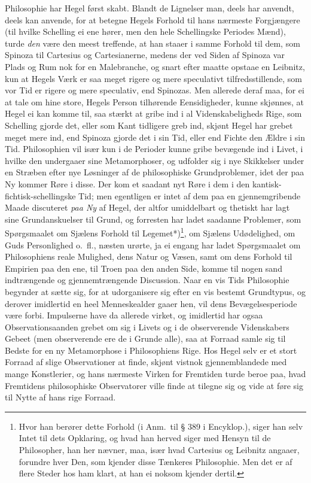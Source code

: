 \documentclass[12pt,a4paper]{book}
\newcommand{\apage}[1]{\marginnote{\footnotesize\textit{[#1]}}}
\begin{document}
Philosophie har Hegel først skabt. Blandt de Lignelser man, deels har
anvendt, deels kan anvende, for at betegne Hegels Forhold til hans nærmeste
Forgjængere (til hvilke Schelling ei ene hører, men den hele Schellingske
Periodes Mænd), turde \emph{den} være den meest treffende, at han staaer i samme
Forhold til dem, som Spinoza til Cartesius og Cartesianerne, medens der ved
Siden af Spinoza var Plads og Rum nok for en Malebranche, og snart efter
maatte opstaae en Leibnitz, kun at Hegels Værk er saa meget rigere og mere
speculativt tilfredsstillende, som vor Tid er rigere og mere speculativ, end
Spinozas. Men allerede deraf maa, for ei at tale om hine store, Hegels
Person tilhørende Eensidigheder, kunne skjønnes, at Hegel ei kan komme til,
saa stærkt at gribe ind i al Videnskabeligheds Rige, som Schelling gjorde
det, eller som Kant tidligere greb ind, skjønt Hegel har grebet meget mere
ind, end Spinoza gjorde det i sin Tid, eller end Fichte den Ældre i sin Tid.
Philosophien vil især kun i de Perioder kunne gribe bevægende ind i Livet, i
hvilke den undergaaer sine Metamorphoser, og udfolder sig i nye Skikkelser
under en Stræben efter nye Løsninger af de philosophiske Grundproblemer,
idet der paa Ny kommer Røre i disse. Der kom et saadant nyt Røre i dem i den
kantisk-fichtisk-schellingske Tid; men egentligen er intet af dem paa en
gjennemgribende Maade discuteret \emph{paa Ny} af Hegel, der altfor umiddelbart og
thetiskt har lagt sine Grundanskuelser til Grund, og forresten har ladet
saadanne Problemer, som Spørgsmaalet om \apage{18} Sjælens Forhold til
Legemet*)\footnote{Hvor han berører dette Forhold (i Anm.\ til § 389 i
Encyklop.), siger han selv Intet til dets Opklaring, og hvad han herved
siger med Hensyn til de Philosopher, han her nævner, maa, især hvad
Cartesius og Leibnitz angaaer, forundre hver Den, som kjender disse
Tænkeres Philosophie. Men det er af flere Steder hos ham klart, at han ei
noksom kjender dertil.}, om Sjælens Udødelighed, om Guds Personlighed
o.\ fl., næsten urørte, ja ei engang har ladet Spørgsmaalet om
Philosophiens reale Mulighed, dens Natur og Væsen, samt om dens Forhold til
Empirien paa den ene, til Troen paa den anden Side, komme til nogen sand
indtrængende og gjennemtrængende Discussion. Naar en vis Tids Philosophie
begynder at sætte sig, for at udorganisere sig efter en vis bestemt
Grundtypus, og derover imidlertid en heel Menneskealder gaaer hen, vil dens
Bevægelsesperiode være forbi. Impulserne have da allerede virket, og
imidlertid har ogsaa Observationsaanden grebet om sig i Livets og i de
observerende Videnskabers Gebeet (men observerende ere de i Grunde alle),
saa at Forraad samle sig til Bedste for en ny Metamorphose i Philosophiens
Rige. Hos Hegel selv er et stort Forraad af slige Observationer at finde,
skjønt vistnok gjennemblandede med mange Konstlerier, og hans nærmeste
Virken for Fremtiden turde beroe paa, hvad Fremtidens philosophiske
Observatorer ville finde at tilegne sig og vide at føre sig til Nytte af
hans rige Forraad.
\end{document}
